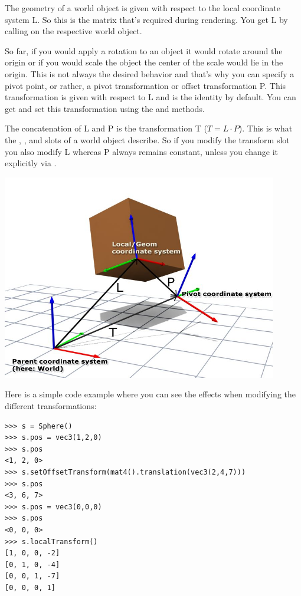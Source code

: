 The geometry of a world object is given with respect to the local
coordinate system L. So this is the matrix that's required during
rendering. You get L by calling  on the
respective world object.

So far, if you would apply a rotation to an object it would rotate
around the origin or if you would scale the object the center of the
scale would lie in the origin. This is not always the desired behavior
and that's why you can specify a pivot point, or rather, a pivot
transformation or offset transformation P. This transformation is
given with respect to L and is the identity by default. You can get
and set this transformation using the  and
 methods.

The concatenation of L and P is the transformation T ($T=L\cdot
P$). This is what the
, ,  and  slots of a world 
object describe. So if you modify the transform slot you also modify L
whereas P always remains constant, unless you change it explicitly via
.

\begin{center}
\includegraphics[width=12cm]{pics/coordsys}
\end{center}

Here is a simple code example where you can see the effects when
modifying the different transformations:

\begin{verbatim}
>>> s = Sphere()
>>> s.pos = vec3(1,2,0)
>>> s.pos
<1, 2, 0>
>>> s.setOffsetTransform(mat4().translation(vec3(2,4,7)))
>>> s.pos
<3, 6, 7>
>>> s.pos = vec3(0,0,0)
>>> s.pos
<0, 0, 0>
>>> s.localTransform()
[1, 0, 0, -2]
[0, 1, 0, -4]
[0, 0, 1, -7]
[0, 0, 0, 1]
\end{verbatim}